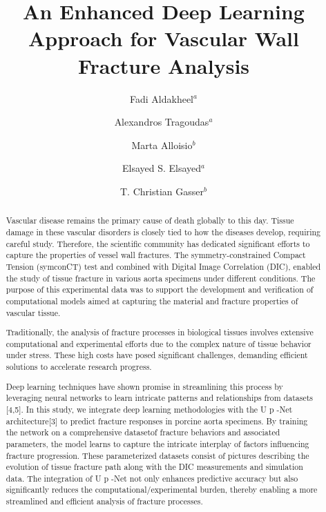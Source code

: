 \documentclass[final,3p,times]{elsarticle}
\begin{document}
\begin{frontmatter}

\title{An Enhanced Deep Learning Approach for Vascular Wall Fracture Analysis}

\author{Fadi Aldakheel\(^{a}\)}
%
\author{Alexandros Tragoudas\(^{a}\)}
%
\author{Marta Alloisio\(^{b}\)}
%
\author{Elsayed S. Elsayed\(^{a}\)}
%
\author{T. Christian Gasser\(^{b}\)}
%

\address{ \(^a\) Institute of Mechanics and Computational Mechanics, Leibniz Universit\"at Hannover, Appelstrasse 9a, 30167 Hannover, Germany} 

\address{ \(^b\) Solid Mechanics, Department of Engineering Mechanics, KTH Royal Institute of Technology, Sweden} 

\begin{abstract}
%
Vascular disease remains the primary cause of death globally to this day. Tissue damage in these vascular disorders is closely tied to how the diseases develop, requiring careful study. Therefore, the scientific community has dedicated significant efforts to capture the properties of vessel wall fractures. The symmetry-constrained Compact Tension (symconCT) test and combined with Digital Image Correlation (DIC), enabled the study of tissue fracture in various aorta specimens under different conditions. The purpose of this experimental data was to support the development and verification of computational models aimed at capturing the material and fracture properties of vascular tissue.

Traditionally, the analysis of fracture processes in biological tissues involves extensive
computational and experimental efforts due to the complex nature of tissue behavior under
stress. These high costs have posed significant challenges, demanding efficient solutions to
accelerate research progress.

Deep learning techniques have shown promise in streamlining this process by leveraging
neural networks to learn intricate patterns and relationships from datasets [4,5]. In this study,
we integrate deep learning methodologies with the U p -Net architecture[3] to predict fracture
responses in porcine aorta specimens. By training the network on a comprehensive datasetof fracture behaviors and associated parameters, the model learns to capture the intricate
interplay of factors influencing fracture progression. These parameterized datasets consist
of pictures describing the evolution of tissue fracture path along with the DIC
measurements and simulation data. The integration of U p -Net not only enhances predictive
accuracy but also significantly reduces the computational/experimental burden, thereby
enabling a more streamlined and efficient analysis of fracture processes.


\end{abstract}
\end{frontmatter}
\end{document}
